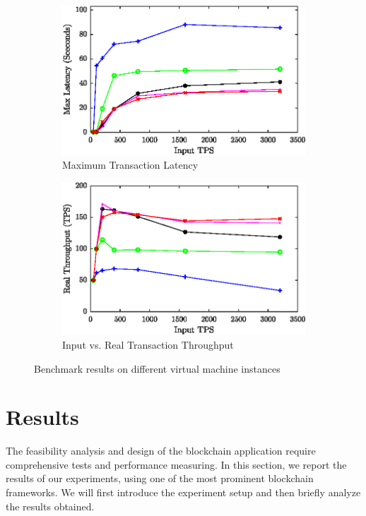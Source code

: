 \documentclass[conference]{IEEEtran}
\begin{document}
\begin{figure}
\begin{subfigure}{0.99\columnwidth}
\includegraphics[width=\columnwidth]{figs/max.eps}%
\caption{Maximum Transaction Latency}%
\label{latency_max}%
\end{subfigure}\hfill%
\begin{subfigure}{0.99\columnwidth}
\includegraphics[width=\columnwidth]{figs/tps.eps}
\caption{Input vs. Real Transaction Throughput}
\label{fig:TPS}
\end{subfigure}\hfill%
\caption{Benchmark results on different virtual machine instances}
\label{latency}%
\end{figure}

\section{Results}

The feasibility analysis and design of the blockchain application require comprehensive tests and performance measuring. In this section, we report the results of our experiments, using one of the most prominent blockchain frameworks. We will first introduce the experiment setup and then briefly analyze the results obtained.
\end{document}
